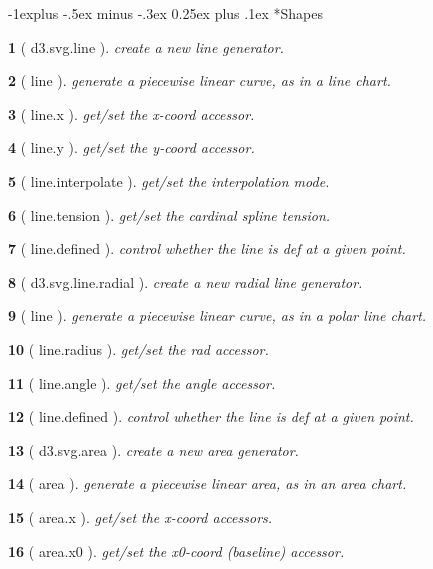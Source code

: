\documentclass[10pt,landscape,letterpaper]{article}
\makeatletter
\newcounter{thm}
\theoremstyle{mytheoremstyle}
\newtheorem*{thm}{}
\renewcommand{\subsection}{\@startsection{subsection}{2}{0mm}%
                                {-1explus -.5ex minus -.3ex}%
                                {0.25ex plus .1ex}%
                                {\normalfont\normalsize\bfseries}}
\makeatother
\begin{document}
\begin{multicols}{3}
\subsection*{Shapes}

\begin{thm} [ d3.svg.line ]  create a new line generator.
\end{thm}\begin{thm} [ line ]  generate a piecewise linear curve, as in a line chart.
\end{thm}\begin{thm} [ line.x ]  get/set the x-coord accessor.
\end{thm}\begin{thm} [ line.y ]  get/set the y-coord accessor.
\end{thm}\begin{thm} [ line.interpolate ]  get/set the interpolation mode.
\end{thm}\begin{thm} [ line.tension ]  get/set the cardinal spline tension.
\end{thm}\begin{thm} [ line.defined ]  control whether the line is def at a given point.
\end{thm}\begin{thm} [ d3.svg.line.radial ]  create a new radial line generator.
\end{thm}\begin{thm} [ line ]  generate a piecewise linear curve, as in a polar line chart.
\end{thm}\begin{thm} [ line.radius ]  get/set the rad accessor.
\end{thm}\begin{thm} [ line.angle ]  get/set the angle accessor.
\end{thm}\begin{thm} [ line.defined ]  control whether the line is def at a given point.
\end{thm}\begin{thm} [ d3.svg.area ]  create a new area generator.
\end{thm}\begin{thm} [ area ]  generate a piecewise linear area, as in an area chart.
\end{thm}\begin{thm} [ area.x ]  get/set the x-coord accessors.
\end{thm}\begin{thm} [ area.x0 ]  get/set the x0-coord (baseline) accessor.

\end{thm}
\end{multicols}
\end{document}
